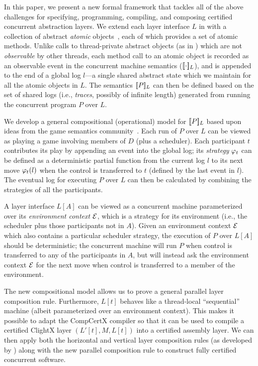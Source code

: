 {In this paper, we present a new formal framework that tackles all of
the above challenges for specifying, programming, compiling, and
composing certified concurrent abstraction layers. We extend each
layer interface $L$ in \citet{dscal15} with a collection of abstract
{\em atomic} objects~\cite{Herlihy08book}, each of which provides a
set of atomic methods. Unlike calls to thread-private abstract objects
(as in \cite{dscal15}) which are not {\em observable} by other
threads, each method call to an atomic object is recorded as an 
observable event in the concurrent machine semantics
($\sem{L}{\cdot}$), and is appended to the end of a global log $l$---a
single shared abstract state which we maintain for all the atomic
objects in $L$. The semantics $\sem{L}{P}$ can then be defined based
on the set of shared logs (i.e., {\em{}traces}, possibly of
infinite length) generated from running the concurrent program $P$
over $L$.

We develop a general compositional (operational) model for
$\sem{L}{P}$ based upon ideas from the game semantics
community~\cite{gsinvite}. Each run of $P$ over $L$ can be viewed as
playing a game involving members of $D$ (plus a scheduler). Each
participant $t$ contributes its play by appending an event into the
global log; its {\em strategy} $\strat{t}$ can be defined as a
deterministic partial function from the current log $l$ to its next
move $\strat{t}(l)$ when the control is transferred to $t$
(defined by the last event in $l$). The
eventual log for executing $P$ over $L$ can then be calculated by
combining the strategies of all the participants.

A layer interface $L[A]$ can be viewed as a concurrent machine
parameterized over its {\em environment context} $\oracle$, which is a
strategy for its environment (i.e., the scheduler plus those
participants not in $A$).  Given an environment context $\oracle$
which also contains a particular scheduler strategy, the execution of
$P$ over $L[A]$ should be deterministic; the concurrent machine will
run $P$ when control is transferred to any of the participants in $A$, but
will instead ask the environment context $\oracle$ for the next move when 
control is transferred to a member of the environment.

The new compositional model allows us to prove a general parallel
layer composition rule. Furthermore, $L[t]$ behaves like a
thread-local ``sequential'' machine (albeit parameterized over an
environment context).  This makes it possible to adapt the CompCertX
compiler so that it can be used to compile a certified ClightX layer
$(L'[t],M,L[t])$ into a certified assembly layer. We can then apply
both the horizontal and vertical layer composition rules (as developed
by \citet{dscal15}) along with the new parallel composition rule to 
construct fully certified concurrent software.
 
}
